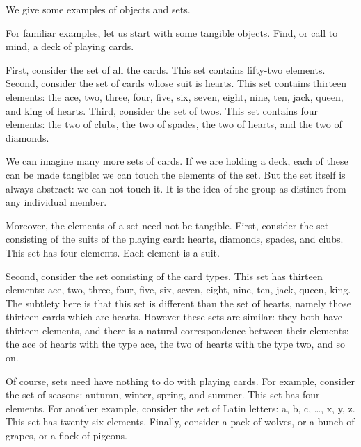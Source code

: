 

We give some examples of objects and sets.


For familiar examples,
let us start
with some tangible
objects.
Find, or call to
mind,
a deck
of playing cards.

First, consider
the set of all
the cards.
This set contains
fifty-two elements.
Second, consider
the set of cards
whose suit is hearts.
This set contains
thirteen elements:
the ace, two, three, four, five,
six, seven, eight, nine, ten,
jack, queen, and
king of hearts.
Third, consider
the set of twos.
This set contains
four elements:
the two of clubs,
the two of spades,
the two of hearts,
and the two of diamonds.

We can imagine many
more sets of cards.
If we are holding a deck,
each of these can be
made tangible: we can
touch the elements of
the set.
But the set itself
is always abstract:
we can not touch it.
It is the idea of the
group as distinct from
any individual member.

Moreover, the
elements of a set
need not be tangible.
First, consider the set
consisting of the suits of
the playing card:
hearts, diamonds, spades, and clubs.
This set has four elements.
Each element is a suit.

Second, consider the set
consisting of the card types.
This set has thirteen elements:
ace, two, three, four, five,
six, seven, eight, nine, ten,
jack, queen, king.
The subtlety here is that
this set is different than
the set of hearts, namely
those thirteen cards which are
hearts.
However these sets are
similar: they both have thirteen
elements, and there is a natural
correspondence between their
elements: the ace of hearts
with the type ace, the two
of hearts with the type two,
and so on.

Of course, sets need have nothing to
do with playing cards.
For example, consider the set of
seasons: autumn, winter, spring,
and summer.
This set has four elements.
For another example,
consider the set of Latin letters:
a, b, c, \dots, x, y, z.
This set has twenty-six elements.
Finally, consider a pack of wolves, or a bunch of grapes, or a flock of pigeons.

